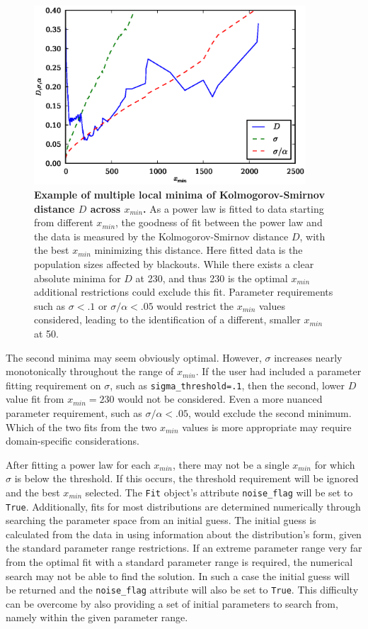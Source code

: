 \documentclass[10pt]{article}
\begin{document}
\begin{figure}[!ht]
\begin{center}
\includegraphics[width=4in]{FigD.eps}
\end{center}
\caption{
{\bf Example of multiple local minima of Kolmogorov-Smirnov distance  $D$ across $x_{min}$.} As a power law is fitted to data starting from different $x_{min}$, the goodness of fit between the power law and the data is measured by the Kolmogorov-Smirnov distance $D$, with the best $x_{min}$ minimizing this distance. Here fitted data is the population sizes affected by blackouts. While there exists a clear absolute minima for $D$ at 230, and thus 230 is the optimal $x_{min}$ additional restrictions could exclude this fit. Parameter requirements such as $\sigma<.1$ or $\sigma /\alpha<.05$ would restrict the $x_{min}$ values considered, leading to the identification of a different, smaller $x_{min}$ at 50.
}
\label{Ds}
\end{figure}

The second minima may seem obviously optimal. However, $\sigma$ increases nearly monotonically throughout the range of $x_{min}$. If the user had included a parameter fitting requirement on $\sigma$, such as \verb$sigma_threshold=.1$, then the second, lower $D$ value fit from $x_{min}=230$ would not be considered. Even a more nuanced parameter requirement, such as $\sigma / \alpha < .05$, would exclude the second minimum. Which of the two fits from the two $x_{min}$ values is more appropriate may require domain-specific considerations. 

After fitting a power law for each $x_{min}$, there may not be a single $x_{min}$ for which $\sigma$ is below the threshold. If this occurs, the threshold requirement will be ignored and the best $x_{min}$ selected. The \verb$Fit$ object's attribute \verb$noise_flag$ will be set to \verb$True$. Additionally, fits for most distributions are determined numerically through searching the parameter space from an initial guess. The initial guess is calculated from the data in using information about the distribution's form, given the standard parameter range restrictions. If an extreme parameter range very far from the optimal fit with a standard parameter range is required, the numerical search may not be able to find the solution. In such a case the initial guess will be returned and the \verb$noise_flag$ attribute will also be set to \verb$True$. This difficulty can be overcome by also providing a set of initial parameters to search from, namely within the given parameter range. 
\end{document}
